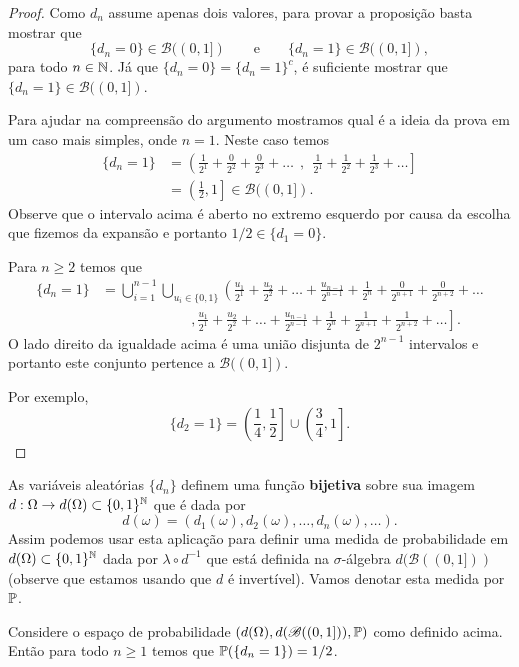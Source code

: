\begin{proof}
Como $d_n$ assume apenas dois valores, 
para provar a proposição basta mostrar 
que 
	\[
		\{d_n=0\}\in\mathscr{B}((0,1])
		\qquad
		\text{e}
		\qquad
		\{d_n=1\}\in\mathscr{B}((0,1]),
	\]
para todo $n\in\N$.
Já que $\{d_n=0\} = \{d_n=1\}^c$, é suficiente
mostrar que $\{d_n=1\}\in \mathscr{B}((0,1])$.



Para ajudar na compreensão do argumento mostramos 
qual é a ideia da prova em um 
caso mais simples, onde $n=1$. Neste caso 
temos 
	\begin{align*}
		\{d_n=1\}
		&=
		\left(
		\frac{1}{2^1}+\frac{0}{2^2}+\frac{0}{2^3}+\ldots
		\right.
		\ \ \mathbf{,} \ \ 
		\left.
		\frac{1}{2^1}+\frac{1}{2^2}+\frac{1}{2^3}+\ldots
		\right]
		\\[0.3cm]
		&=
		\left(\frac{1}{2},1\right]
		\in \mathscr{B}((0,1]).
	\end{align*}
Observe que o intervalo acima é aberto no extremo esquerdo
por causa da escolha que fizemos da expansão e portanto 
$1/2\in \{d_1=0\}$.

Para $n\geq 2$ temos que 
	\begin{align*}
		\{d_n=1\}
		&=
		\bigcup_{i=1}^{n-1}\bigcup_{u_i\in\{0,1\}}
		\left(
		\frac{u_1}{2^1}+\frac{u_2}{2^2}+\ldots+\frac{u_{n-1}}{2^{n-1}}+\frac{1}{2^{n}}
		+\frac{0}{2^{n+1}}+\frac{0}{2^{n+2}}+
		\ldots
		\right.
		\\
		&\qquad\qquad\qquad
		\ \ \mathbf{,} 
		\left.
		\frac{u_1}{2^1}+\frac{u_2}{2^2}+\ldots+\frac{u_{n-1}}{2^{n-1}}+\frac{1}{2^{n}}
		+\frac{1}{2^{n+1}}+\frac{1}{2^{n+2}}+
		\ldots
		\right].
	\end{align*}
O lado direito da igualdade acima é uma união 
disjunta de $2^{n-1}$ intervalos e portanto este
conjunto pertence a $\mathscr{B}((0,1])$.

Por exemplo, 
	\[
	\{d_2=1\} 
	= \left( \frac{1}{4},\frac{1}{2} \right]
	\cup 
	\left( \frac{3}{4},1  \right].
	\]
\end{proof}



As variáveis aleatórias $\{d_n\}$ definem uma 
função {\bf bijetiva} sobre sua imagem $d:\Omega\to d(\Omega)\subset \{0,1\}^{\N}$ que é dada por 
	\[
		d(\omega)
		=
		(d_1(\omega),d_2(\omega),\ldots,d_n(\omega),\ldots).
	\]
Assim podemos usar esta aplicação para definir uma medida de
probabilidade em $d(\Omega)\subset \{0,1\}^{\N}$ dada por $\lambda\circ d^{-1}$
que está definida na $\sigma$-álgebra $d(\mathscr{B}((0,1]))$
(observe que estamos usando que $d$ é invertível).
Vamos denotar esta medida por $\P$.



\begin{proposicao}
 Considere o espaço de probabilidade $(d(\Omega),d(\mathscr{B}((0,1])),\P)$
 como definido acima. Então para todo $n\geq 1$ temos que
 $\P(\{d_n=1\})=1/2$.
\end{proposicao}



